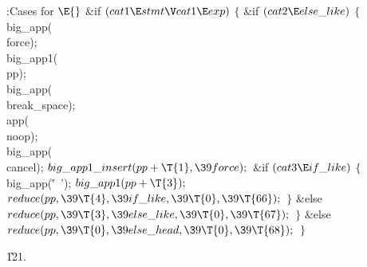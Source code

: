 \B{}:Cases for \X${}\E{}$\6
\&{if} ${}(\\{cat1}\E\\{stmt}\V\\{cat1}\E\\{exp}){}$\5
${}\{{}$\1\6
\&{if} ${}(\\{cat2}\E\\{else\_like}){}$\5
${}\{{}$\1\6
\\{big\_app}(\\{force});\6
\\{big\_app1}(\\{pp});\6
\\{big\_app}(\\{break\_space});\6
\\{app}(\\{noop});\6
\\{big\_app}(\\{cancel});\6
${}\\{big\_app1\_insert}(\\{pp}+\T{1},\39\\{force});{}$\6
\&{if} ${}(\\{cat3}\E\\{if\_like}){}$\5
${}\{{}$\1\6
\\{big\_app}(\.{'\ '});\6
${}\\{big\_app1}(\\{pp}+\T{3});{}$\6
${}\\{reduce}(\\{pp},\39\T{4},\39\\{if\_like},\39\T{0},\39\T{66});{}$\6
\4${}\}{}$\2\6
\&{else}\1\5
${}\\{reduce}(\\{pp},\39\T{3},\39\\{else\_like},\39\T{0},\39\T{67});{}$\2\6
\4${}\}{}$\2\6
\&{else}\1\5
${}\\{reduce}(\\{pp},\39\T{0},\39\\{else\_head},\39\T{0},\39\T{68});{}$\2\6
\4${}\}{}$\2\par
\U121.\fi

